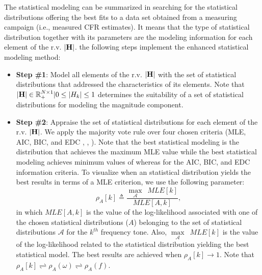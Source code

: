 \documentclass[journal]{IEEEtran}
\begin{document}
The statistical modeling can be summarized in searching for the statistical distributions offering the best fits to a data set obtained from a measuring campaign (i.e., measured \ac{CFR} estimates). It means that the type of statistical distribution together with its parameters are the modeling information for each element of the \ac{r.v.}  ${\bf |H|}$. %
the following steps implement the enhanced statistical modeling method:
\begin{itemize}
	\item \textbf{Step \#1}: Model all elements of the \ac{r.v.} $\bf |H|$ with the set of statistical distributions that addressed the characteristics of its elements. Note that ${\bf |H|} \in \mathbb{R}_{+}^{N\times 1}|0 \leq {|H_k|} \leq 1$ determines the suitability of a set of statistical distributions for modeling the magnitude component.
	\item \textbf{Step \#2}: Appraise the set of statistical distributions for each element of the \ac{r.v.} $\bf |H|$. We apply the majority vote rule \cite{vote} over four chosen criteria (\ac{MLE}, \ac{AIC}, \ac{BIC}, and \ac{EDC} \cite{Dorea:Sim}, \cite{Cabral:Multi}, \cite{Andrei:Meas}). Note that the best statistical modeling is the distribution that achieves the maximum \ac{MLE} value while the best statistical modeling achieves minimum values of whereas for the \ac{AIC}, \ac{BIC}, and \ac{EDC} information criteria. 
	To visualize when an statistical distribution yields the best results in terms of a \ac{MLE} criterion, we use the following parameter:
    \begin{equation}
    \rho_{A} [k] \triangleq \dfrac{\underset{\mathcal{A}}{\max} \,\, \, MLE[k]}{MLE[A,k]},
    \label{eq:log-lik}
    \end{equation}
    in which $ MLE[A,k]$ is the value of the log-likelihood associated with one of the chosen statistical distributions ($A$) belonging to the set of statistical distributions $\mathcal{A}$ for the $k^{th}$ frequency tone. Also, $\underset{\mathcal{A}}{\max} \,\, \, MLE[k]$ is the value of the log-likelihood related to the statistical distribution yielding the best statistical model. The best results are achieved when $\rho_A [k] \rightarrow 1$. Note that $\rho_A [k] \rightleftharpoons \rho_A (\omega) \rightleftharpoons \rho_A (f)$.

\end{itemize}
\end{document}
